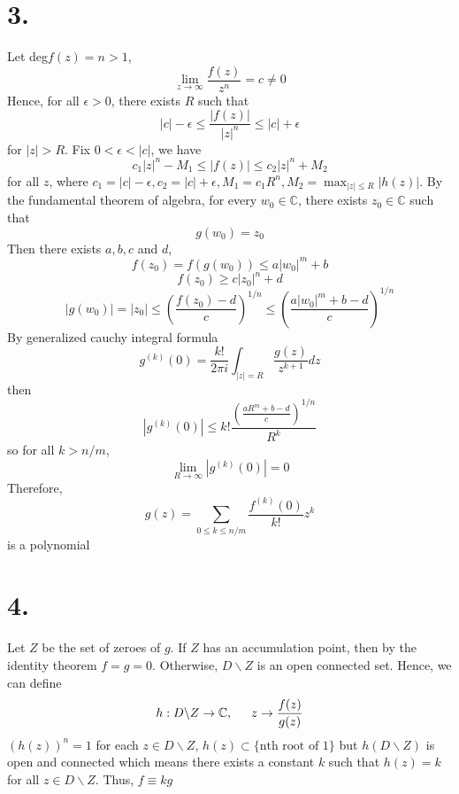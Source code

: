 \documentclass[11pt]{article}
\begin{document}
\section*{3.}
Let deg$f(z) = n > 1$,
\[
    \lim_{z\to \infty} \frac{f(z)}{z^n} = c \ne 0    
\]
Hence, for all $\epsilon > 0 $, there exists $R$ such that 
\[
    |c|-\epsilon \le \frac{|f(z)|}{|z|^n} \le |c|+\epsilon    
\]
for $|z|>R$. Fix $0<\epsilon <|c|$, we have 
\[
    c_1|z|^n - M_1 \le |f(z)| \le c_2|z|^n + M_2    
\]
for all $z$, where $c_1 = |c|-\epsilon , c_2 = |c|+ \epsilon, M_1 = c_1R^n, M_2 = \max_{|z|\le R} |h(z)|$.
By the fundamental theorem of algebra, for every $w_0 \in \mathbb{C}$, there exists $z_0 \in \mathbb{C}$ such that 
\[
    g(w_0) = z_0 
\]
Then there exists $a,b,c$ and $d$, 
\[
    f(z_0) = f(g(w_0)) \le a|w_0|^m + b    
\]
\[
    f(z_0) \ge c|z_0|^n + d    
\]
\[
    |g(w_0)| = |z_0| \le \left(\frac{f(z_0) - d}{c}\right)^{1/n} \le \left(\frac{a|w_0|^m + b-d}{c} \right)^{1/n} 
\]
By generalized cauchy integral formula
\[
    g^{(k)}(0) =\frac{k!}{2\pi i} \int_{|z|=R} \frac{g(z)}{z^{k+1}} dz    
\]
then 
\[
    |g^{(k)}(0)| \le k! \frac{\left(\frac{aR^m + b-d}{c} \right)^{1/n} }{R^k}
\]
so for all $k>n/m$, 
\[
    \lim_{R \to \infty} |g^{(k)}(0)| = 0 
\]
Therefore, 
\[
    g(z) = \sum_{0 \le k \le n/m} \frac{f^{(k)}(0)}{k!}z^k
\]
is a polynomial
\newpage
\section*{4.}
Let $Z$ be the set of zeroes of $g$. If $Z$ has an accumulation point, then by the identity theorem $f = g = 0$. Otherwise, 
$D \backslash Z$ is an open connected set. Hence, we can define
\[
    h: D \backslash Z \to \mathbb{C}, \indent z \to \frac{f(z)}{g(z)}    
\]
$(h(z))^n = 1$ for each $z \in D\backslash Z$, $h(z) \subset \{\text{nth root of 1} \}$ but $h(D \backslash Z)$ is open and connected which means there exists a constant $k$ such that 
$h(z) = k$ for all $z \in D \backslash Z$. Thus, $f \equiv kg$ 
\end{document}
